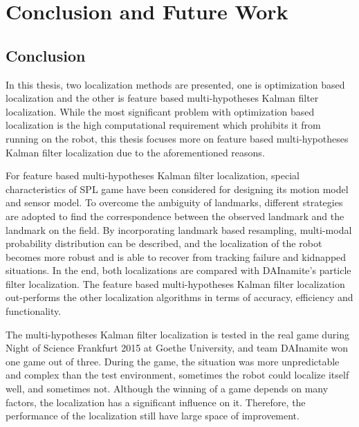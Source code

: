 \chapter{Conclusion and Future Work\label{cha:chapter7}}

\section{Conclusion\label{sec:conclusion}}
In this thesis, two localization methods are presented, one is optimization based localization and the other is feature based multi-hypotheses Kalman filter localization. While the most significant problem with optimization based localization is the high computational requirement which prohibits it from running on the robot, this thesis focuses more on feature based multi-hypotheses Kalman filter localization due to the aforementioned reasons.

For feature based multi-hypotheses Kalman filter localization, special characteristics of \gls{SPL} game have been considered for designing its motion model and sensor model. To overcome the ambiguity of landmarks, different strategies are adopted to find the correspondence between the observed landmark and the landmark on the field. By incorporating landmark based resampling, multi-modal probability distribution can be described, and the localization of the robot becomes more robust and is able to recover from tracking failure and kidnapped situations. In the end, both localizations are compared with DAInamite's particle filter localization. The feature based  multi-hypotheses Kalman filter localization out-performs the other localization algorithms in terms of accuracy, efficiency and functionality. 

The multi-hypotheses Kalman filter localization is tested in the real game during Night of Science Frankfurt 2015 at Goethe University, and team DAInamite won one game out of three. During the game, the situation was more unpredictable and complex than the test environment, sometimes the robot could localize itself well, and sometimes not. Although the winning of a game depends on many factors, the localization has a significant influence on it. Therefore, the performance of the localization still have large space of improvement.  

